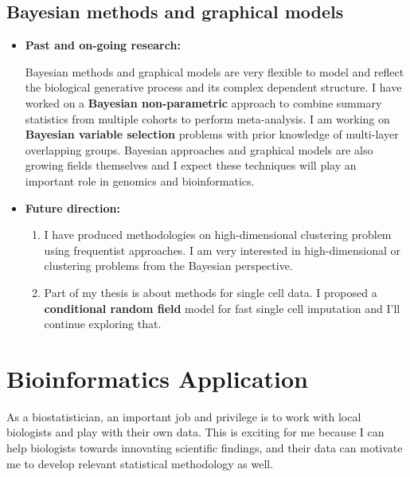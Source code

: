 \documentclass[a4paper, 10pt]{article}
\begin{document}
\subsection{Bayesian methods and graphical models}
\begin{itemize}
\item \textbf{Past and on-going research:}

Bayesian methods and graphical models are very flexible to model and reflect the biological generative process and its complex dependent structure.
I have worked on a \textbf{Bayesian non-parametric} approach to combine summary statistics from multiple cohorts to perform meta-analysis\cite{ref:BayesMP}.
I am working on \textbf{Bayesian variable selection} problems\cite{ref:MOG} with prior knowledge of multi-layer overlapping groups.
Bayesian approaches and graphical models are also growing fields themselves and I expect these techniques will play an important role in genomics and bioinformatics.

\item \textbf{Future direction:}
\begin{enumerate}
\item I have produced methodologies on high-dimensional clustering problem using frequentist approaches.
I am very interested in high-dimensional or clustering problems from the Bayesian perspective.
\item Part of my thesis is about methods for single cell data.
I proposed a \textbf{conditional random field} model for fast single cell imputation
and I'll continue exploring that.

\end{enumerate}

\end{itemize}


\section{Bioinformatics Application}
As a biostatistician,
an important job and privilege is to work with local biologists and play with their own data.
This is exciting for me because I can help biologists towards innovating scientific findings,
and their data can motivate me to develop relevant statistical methodology as well.
\end{document}
